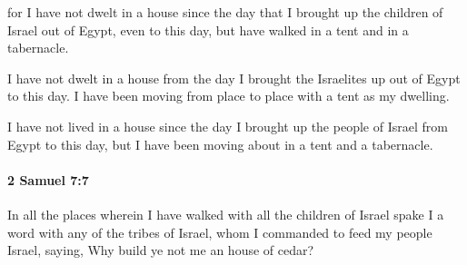 			\begin{versebox}
					\item[BHS] 
					\item[ASV] for I have not dwelt in a house since the day that I brought up the children of Israel out of Egypt, even to this day, but have walked in a tent and in a tabernacle.
					\item[NIV] I have not dwelt in a house from the day I brought the Israelites up out of Egypt to this day. I have been moving from place to place with a tent as my dwelling.
					\item[NRSV] I have not lived in a house since the day I brought up the people of Israel from Egypt to this day, but I have been moving about in a tent and a tabernacle.
			\end{versebox}

		\paragraph{2 Samuel 7:7} %
			\label{2SAMUEL-7-7}

			In all the places wherein I have walked with all the children of Israel spake I a word with any of the tribes of Israel, whom I commanded to feed my people Israel, saying, Why build ye not me an house of cedar?

